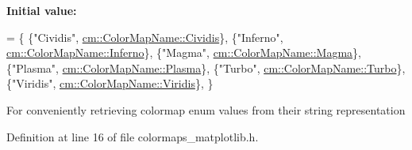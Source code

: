 {\bfseries Initial value\+:}
\begin{DoxyCode}
= \{
    \{\textcolor{stringliteral}{"Cividis"}, \hyperlink{namespacecm_aabaf84796e8a93bd6adca4c5bdea5311a64c2ad47aeb457c258518a5318ed071d}{cm::ColorMapName::Cividis}\},
    \{\textcolor{stringliteral}{"Inferno"}, \hyperlink{namespacecm_aabaf84796e8a93bd6adca4c5bdea5311a8bb279f735c1d9c831e935cca2613b58}{cm::ColorMapName::Inferno}\},
    \{\textcolor{stringliteral}{"Magma"}, \hyperlink{namespacecm_aabaf84796e8a93bd6adca4c5bdea5311a1b62e99f86d45e754e5e79d9fa9dfcde}{cm::ColorMapName::Magma}\},
    \{\textcolor{stringliteral}{"Plasma"}, \hyperlink{namespacecm_aabaf84796e8a93bd6adca4c5bdea5311ab20a4217acaf4316739c6a5f6679ef60}{cm::ColorMapName::Plasma}\},
    \{\textcolor{stringliteral}{"Turbo"}, \hyperlink{namespacecm_aabaf84796e8a93bd6adca4c5bdea5311a6f53bfe04e78da893ba0c4f35ba6847e}{cm::ColorMapName::Turbo}\},
    \{\textcolor{stringliteral}{"Viridis"}, \hyperlink{namespacecm_aabaf84796e8a93bd6adca4c5bdea5311a951ee92ee5e947e1e7e1cb6376523c1a}{cm::ColorMapName::Viridis}\},
\}
\end{DoxyCode}
For conveniently retrieving colormap enum values from their string representation 

Definition at line 16 of file colormaps\+\_\+matplotlib.\+h.

